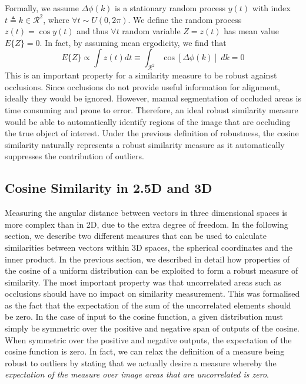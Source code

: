 Formally, we assume $\Delta \phi(k)$ is a stationary random process $y(t)$ with
index $t \triangleq k \in \mathcal{R}^2$, where $\forall t \sim U(0, 2\pi)$. We
define the random process $z(t) = \cos{y(t)}$ and thus $\forall t$ random
variable $Z = z(t)$ has mean value $E\{Z\} = 0$. In fact, by assuming mean
ergodicity, we find that
\begin{equation}\label{eq:cosine_integral}
    E\{Z\} \propto \int z(t) dt \equiv \int_{\mathcal{R}^2} \cos[\Delta \phi(k)] \; dk = 0
\end{equation}
This is an important property for a similarity measure to be robust against
occlusions. Since occlusions do not provide useful information for alignment,
ideally they would be ignored. However, manual segmentation of occluded areas is
time consuming and prone to error. Therefore, an ideal robust similarity measure
would be able to automatically identify regions of the image that are occluding
the true object of interest. Under the previous definition of robustness, the
cosine similarity naturally represents a robust similarity measure as it
automatically suppresses the contribution of outliers.
\subsection{Cosine Similarity in 2.5D and 3D}\label{subsec:cosine_3d}
Measuring the angular distance between vectors in three dimensional spaces
is more complex than in 2D, due to the extra degree of freedom. In the following
section, we describe two different measures that can be used to calculate
similarities between vectors within 3D spaces, the spherical coordinates and the
inner product. In the previous section, we described in detail how properties of
the cosine of a uniform distribution can be exploited to form a robust measure
of similarity. The most important property was that uncorrelated areas such as
occlusions should have no impact on similarity measurement. This was formalised
as the fact that the expectation of the sum of the uncorrelated elements should
be zero. In the case of input to the cosine function, a given distribution must
simply be symmetric over the positive and negative span of outputs of the
cosine. When symmetric over the positive and negative outputs, the expectation
of the cosine function is zero. In fact, we can relax the definition of a
measure being robust to outliers by stating that we actually desire a measure 
whereby the \textit{expectation of the measure over image areas that are 
uncorrelated is zero}.

